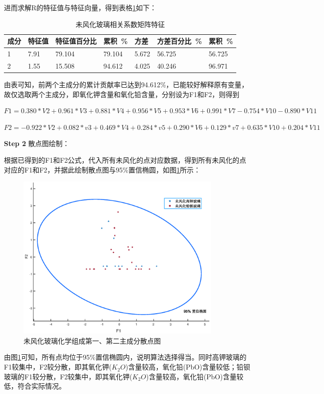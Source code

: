 \documentclass{my_paper}
\begin{document}
进而求解R的特征值与特征向量，得到表格\ref{未风化玻璃相关系数矩阵特征}如下：
\begin{table}[H]
    \centering
    \caption{未风化玻璃相关系数矩阵特征}
    \label{未风化玻璃相关系数矩阵特征}
    \begin{tabular}{lllllll}
    \hline
        成分 & 特征值 & 特征值百分比 & 累积 \% & 方差 & 方差百分比 \% & 累积 \% \\ \hline
        1 & 7.91 & 79.104 & 79.104 & 5.672 &  56.725 & 56.725 \\ 
        2 & 1.55 & 15.508 & 94.612 & 4.025 &  40.246 & 96.971 \\ \hline
    \end{tabular}
\end{table}
由表可知，前两个主成分的累计贡献率已达到94.612\%，已能较好解释原有变量，故仅选取两个主成分，即氧化钾含量和氧化铅含量，分别设为F1和F2，则得到

$
    F1=0.380*V2 + 0.961*V3 + 0.881*V4 + 0.956*V5 + 0.953*V6 + 0.991*V7 - 0.754*V10 - 0.890*V11
$

$
    F2=-0.922*V2+0.082*v3+0.469*V4+0.284*v5+0.290*V6+0.129*v7+0.635*V10+0.204*V11
$

\textbf{Step 2} 散点图绘制：\par
根据已得到的F1和F2公式，代入所有未风化的点对应数据，得到所有未风化的点对应的F1和F2，并据此绘制散点图与95\%置信椭圆，如图\ref{未风化}所示：
\begin{figure}[H]
\centering
\includegraphics[width=0.9\textwidth]{未风化.eps}
\caption{未风化玻璃化学组成第一、第二主成分散点图}
\label{未风化}
\end{figure}
由图\ref{未风化}可知，所有点均位于95\%置信椭圆内，说明算法选择得当。同时高钾玻璃的F1较集中，F2较分散，即其氧化钾($K_2O$)含量较高，氧化铅(PbO)含量较低；铅钡玻璃的F1较分散，F2较集中，即其氧化钾($K_2O$)含量较高，氧化铅(PbO)含量较低，符合实际情况。\par
\end{document}
